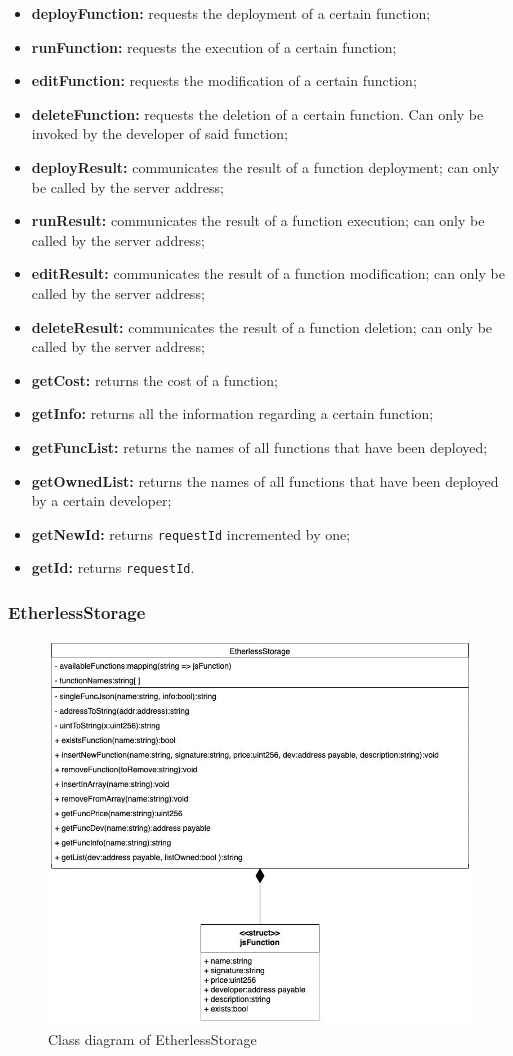 	\begin{itemize}
		\item \textbf{deployFunction:} requests the deployment of a certain function;
		\item \textbf{runFunction:} requests the execution of a certain function;
		\item \textbf{editFunction:} requests the modification of a certain function;
		\item \textbf{deleteFunction:} requests the deletion of a certain function. Can only be invoked by the developer of said function;
		\item \textbf{deployResult:} communicates the result of a function deployment; can only be called by the server address;
		\item \textbf{runResult:} communicates the result of a function execution; can only be called by the server address;
		\item \textbf{editResult:} communicates the result of a function modification; can only be called by the server address;
		\item \textbf{deleteResult:} communicates the result of a function deletion; can only be called by the server address;
		\item \textbf{getCost:} returns the cost of a function;
		\item \textbf{getInfo:} returns all the information regarding a certain function;
		\item \textbf{getFuncList:} returns the names of all functions that have been deployed;
		\item \textbf{getOwnedList:} returns the names of all functions that have been deployed by a certain developer;
		\item \textbf{getNewId:} returns \texttt{requestId} incremented by one;
		\item \textbf{getId:} returns \texttt{requestId}.
	\end{itemize}

\subsubsection{EtherlessStorage}
	\begin{figure}[H]
		\centering
		\includegraphics[width=0.6\linewidth]{diagrammi/etherless-smart/EtherlessStorage.jpg}
		\caption{Class diagram of EtherlessStorage}
	\end{figure}

